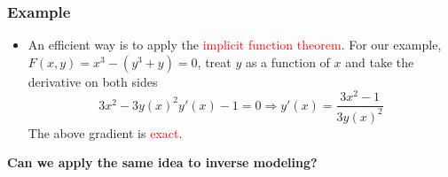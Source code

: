 \documentclass[usenames,dvipsnames]{beamer}
\begin{document}
\begin{frame}
	\frametitle{Example}
	
	\begin{itemize}
		\item An efficient way is to apply the \textcolor{red}{implicit function theorem}. For our example, $F(x,y)=x^3-(y^3+y)=0$, treat $y$ as a function of $x$ and take the derivative on both sides
		$$3x^2 - 3y(x)^2y'(x)-1=0\Rightarrow y'(x) = \frac{3x^2-1}{3y(x)^2}$$
		The above gradient is \textcolor{red}{exact}.
	\end{itemize}
	\begin{center}
		\textbf{Can we apply the same idea to inverse modeling?}
	\end{center}
	
\end{frame}
\end{document}
